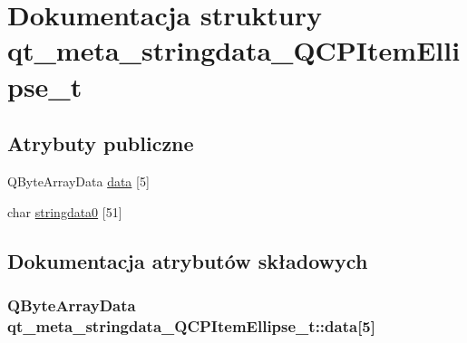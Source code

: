 \hypertarget{structqt__meta__stringdata___q_c_p_item_ellipse__t}{}\section{Dokumentacja struktury qt\+\_\+meta\+\_\+stringdata\+\_\+\+Q\+C\+P\+Item\+Ellipse\+\_\+t}
\label{structqt__meta__stringdata___q_c_p_item_ellipse__t}
\subsection*{Atrybuty publiczne}
\begin{DoxyCompactItemize}
\item 
Q\+Byte\+Array\+Data \hyperlink{structqt__meta__stringdata___q_c_p_item_ellipse__t_ac8506617981990ea7d33afbc41f97fd2}{data} \mbox{[}5\mbox{]}
\item 
char \hyperlink{structqt__meta__stringdata___q_c_p_item_ellipse__t_a47fd49f50069acd98fc8a4f2dec3672a}{stringdata0} \mbox{[}51\mbox{]}
\end{DoxyCompactItemize}


\subsection{Dokumentacja atrybutów składowych}
\subsubsection[{\texorpdfstring{data}{data}}]{\setlength{\rightskip}{0pt plus 5cm}Q\+Byte\+Array\+Data qt\+\_\+meta\+\_\+stringdata\+\_\+\+Q\+C\+P\+Item\+Ellipse\+\_\+t\+::data\mbox{[}5\mbox{]}}\hypertarget{structqt__meta__stringdata___q_c_p_item_ellipse__t_ac8506617981990ea7d33afbc41f97fd2}{}\label{structqt__meta__stringdata___q_c_p_item_ellipse__t_ac8506617981990ea7d33afbc41f97fd2}
